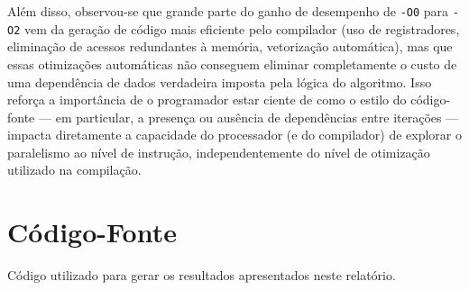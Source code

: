 \documentclass[a4paper,12pt]{article}
\begin{document}
Além disso, observou-se que grande parte do ganho de desempenho de \texttt{-O0} para \texttt{-O2} vem da geração de código mais eficiente pelo compilador (uso de registradores, eliminação de acessos redundantes à memória, vetorização automática), mas que essas otimizações automáticas não conseguem eliminar completamente o custo de uma dependência de dados verdadeira imposta pela lógica do algoritmo. Isso reforça a importância de o programador estar ciente de como o estilo do código-fonte — em particular, a presença ou ausência de dependências entre iterações — impacta diretamente a capacidade do processador (e do compilador) de explorar o paralelismo ao nível de instrução, independentemente do nível de otimização utilizado na compilação.

\newpage
\appendix

\section{Código-Fonte}
\label{sec:codigo}

Código utilizado para gerar os resultados apresentados neste relatório.


\end{document}

